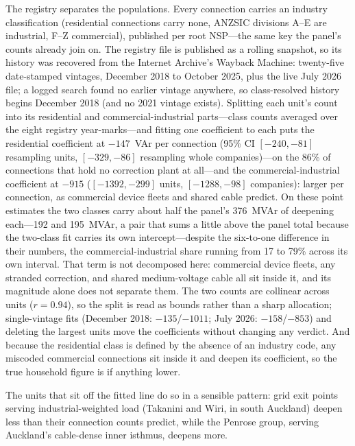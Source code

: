 \documentclass[journal]{IEEEtran}
\begin{document}
The registry separates the populations. Every connection carries an industry
classification (residential connections carry none, ANZSIC divisions A--E are
industrial, F--Z commercial), published per root NSP---the same key the
panel's counts already join on. The registry file is published as a rolling snapshot, so its history was
recovered from the Internet Archive's Wayback Machine: twenty-five
date-stamped vintages, December 2018 to October 2025, plus the live July
2026 file; a logged search found no earlier vintage anywhere, so
class-resolved history begins December 2018 (and no 2021 vintage exists).
Splitting each unit's count into its
residential and commercial-industrial parts---class counts averaged over the
eight registry year-marks---and fitting one coefficient to
each puts the residential coefficient at $-147$~VAr per connection (95\% CI
$[-240,-81]$ resampling units, $[-329,-86]$ resampling whole
companies)---on the 86\% of connections that hold no correction plant at
all---and the
commercial-industrial coefficient at $-915$ ($[-1392,-299]$ units,
$[-1288,-98]$ companies): larger per connection, as commercial device fleets
and shared cable predict. On these point estimates the two classes carry
about half the panel's 376~MVAr of deepening each---192 and 195~MVAr, a pair
that sums a little above the panel total because the two-class fit carries its
own intercept---despite the six-to-one difference in their numbers, the commercial-industrial share
running from 17 to 79\% across its own interval. That term is not decomposed
here: commercial device fleets, any stranded correction, and shared
medium-voltage cable all sit inside it, and its magnitude alone does not
separate them. The two counts are
collinear across units ($r=0.94$), so the split is read as bounds rather
than a sharp allocation; single-vintage fits (December 2018: $-135$/$-1011$;
July 2026: $-158$/$-853$) and deleting the largest units move the
coefficients without changing any verdict. And because
the residential class is defined by the absence of an industry code, any
miscoded commercial connections sit inside it and deepen its coefficient, so
the true household figure is if anything lower.

The units that sit off the fitted line do so in a sensible
pattern: grid exit points serving
industrial-weighted load (Takanini and Wiri, in south Auckland) deepen less than
their connection counts predict, while the Penrose group, serving Auckland's
cable-dense inner isthmus, deepens more.
\end{document}
